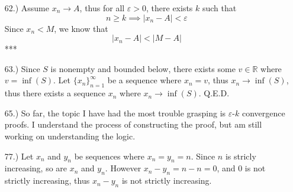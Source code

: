 \documentclass[12pt]{article}
\newcommand{\vertb}[1]{\left\vert#1\right\vert}
\begin{document}
\begin{itemize}




    \item [62.)] Assume $x_n\to A$, thus for all $\varepsilon>0$, there exists $k$ such that
    \[n\geq k\implies\vertb{x_n-A}<\varepsilon\]
    Since $x_n<M$, we know that
    \[\vertb{x_n-A}<\vertb{M-A}\]
    ***

    \item [63.)] Since $S$ is nonempty and bounded below, there exists some $v\in\mathbb{R}$ where $v=\inf(S)$. Let $\{x_n\}^\infty_{n=1}$ be a sequence where $x_n=v$, thus $x_n\to\inf(S)$, thus there exists a sequence $x_n$ where $x_n\to\inf(S)$. Q.E.D.


    \item [65.)] So far, the topic I have had the most trouble grasping is $\varepsilon$-$k$ convergence proofs. I understand the process of constructing the proof, but am still working on understanding the logic.










    \item [77.)] Let $x_n$ and $y_n$ be sequences where $x_n=y_n=n$. Since $n$ is stricly increasing, so are $x_n$ and $y_n$. However $x_n-y_n=n-n=0$, and $0$ is not strictly increasing, thus $x_n-y_n$ is not strictly increasing.


\end{itemize}
\end{document}
